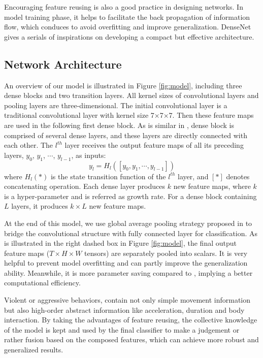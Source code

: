 \documentclass[10pt,twocolumn,letterpaper]{article}
\begin{document}
Encouraging feature reusing is also a good practice in designing networks. In model training phase, it helps to facilitate the back propagation of information flow, which conduces to avoid overfitting and improve generalization. DenseNet \cite{densenet} gives a serials of inspirations on developing a compact but effective architecture.

\subsection{Network Architecture}

An overview of our model is illustrated in Figure \ref{fig:model}, including three dense blocks and two transition layers. 
All kernel sizes of convolutional layers and pooling layers are three-dimensional. 
The initial convolutional layer is a traditional convolutional layer with kernel size 7$\times$7$\times$7. 
Then these feature maps are used in the following first dense block. 
As is similar in \cite{densenet}, dense block is comprised of several dense layers, and these layers are directly connected with each other. 
The $l^{th}$ layer receives the output feature maps of all its preceding layers, $y_0$, $y_1$, $\cdots$, $y_{l-1}$, as inputs:
\begin{equation}
\label{eq:densenet}
y_l = H_l\left([y_0, y_1, \cdots, y_{l-1}]\right)
\end{equation}
where $H_l(*)$ is the state transition function of the $l^{th}$ layer, and $[*]$ denotes concatenating operation.
Each dense layer produces $k$ new feature maps, where $k$ is a hyper-parameter and is referred as growth rate. For a dense block containing $L$ layers, it produces $k \times L$ new feature maps.

At the end of this model, we use global average pooling strategy proposed in \cite{NinN} to bridge the convolutional structure with fully connected layer for classification.
As is illustrated in the right dashed box in Figure \ref{fig:model}, the final output feature maps ($T \times H \times W$ tensors) are separately pooled into scalars.
It is very helpful to prevent model overfitting and can partly improve the generalization ability. 
Meanwhile, it is more parameter saving compared to , implying a better computational efficiency.

Violent or aggressive behaviors, contain not only simple movement information but also high-order abstract information like acceleration, duration and body interaction. 
By taking the advantages of feature reusing, the collective knowledge of the model is kept and used by the final classifier to make a judgement or rather fusion based on the composed features, which can achieve more robust and generalized results. 
\end{document}
